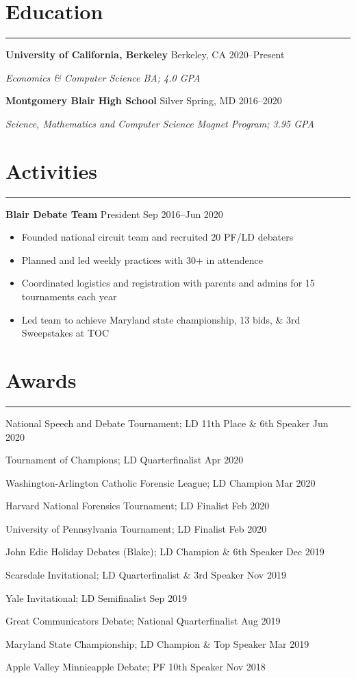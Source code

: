 \documentclass[11pt]{article}
\newcommand{\resumesection}[1]{\vspace{-0.4cm}\section*{\color{highlight}#1}\vspace{-0.3cm}\hrule\vspace{0.3cm}}
\begin{document}
\resumesection{Education}

\textbf{University of California, Berkeley} Berkeley, CA \hfill 2020--Present \par
\textit{Economics \& Computer Science BA; 4.0 GPA}

\textbf{Montgomery Blair High School} Silver Spring, MD \hfill 2016--2020 \par
\textit{Science, Mathematics and Computer Science Magnet Program; 3.95 GPA}


\resumesection{Activities}

\textbf{Blair Debate Team} President \hfill Sep 2016--Jun 2020 \par
\begin{itemize}
	\item Founded national circuit team and recruited 20 PF/LD debaters
	\item Planned and led weekly practices with 30+ in attendence
	\item Coordinated logistics and registration with parents and admins for 15 tournaments each year
	\item Led team to achieve Maryland state championship, 13 bids, \& 3rd Sweepstakes at TOC
\end{itemize}\vspace{0.1cm}

\resumesection{Awards}

National Speech and Debate Tournament; LD 11th Place \& 6th Speaker \hfill Jun 2020 \par
Tournament of Champions; LD Quarterfinalist \hfill Apr 2020 \par
Washington-Arlington Catholic Forensic League; LD Champion \hfill Mar 2020 \par
Harvard National Forensics Tournament; LD Finalist \hfill Feb 2020 \par
University of Pennsylvania Tournament; LD Finalist \hfill Feb 2020 \par
John Edie Holiday Debates (Blake); LD Champion \& 6th Speaker \hfill Dec 2019 \par
Scarsdale Invitational; LD Quarterfinalist \& 3rd Speaker \hfill Nov 2019 \par
Yale Invitational; LD Semifinalist \hfill Sep 2019 \par
Great Communicators Debate; National Quarterfinalist \hfill Aug 2019 \par
Maryland State Championship; LD Champion \& Top Speaker \hfill Mar 2019 \par
Apple Valley Minnieapple Debate; PF 10th Speaker \hfill Nov 2018
\end{document}
